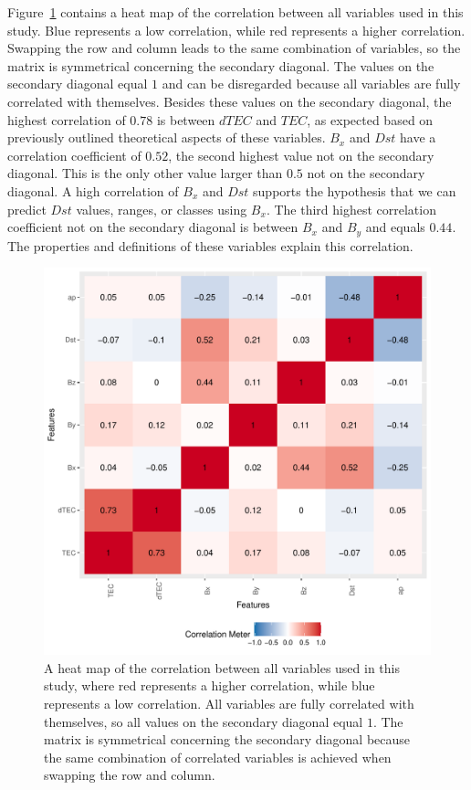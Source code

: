 \documentclass[sn-mathphys-num]{sn-jnl}%
\begin{document}
Figure~\ref{fig:correlation} contains a heat map of the correlation between all variables used in this study. Blue represents a low correlation, while red represents a higher correlation. Swapping the row and column leads to the same combination of variables, so the matrix is symmetrical concerning the secondary diagonal. The values on the secondary diagonal equal $1$ and can be disregarded because all variables are fully correlated with themselves. Besides these values on the secondary diagonal, the highest correlation of $0.78$ is between $dTEC$ and $TEC$, as expected based on previously outlined theoretical aspects of these variables. $B_{x}$ and $Dst$ have a correlation coefficient of $0.52$, the second highest value not on the secondary diagonal. This is the only other value larger than $0.5$ not on the secondary diagonal. A high correlation of $B_{x}$ and $Dst$ supports the hypothesis that we can predict $Dst$ values, ranges, or classes using $B_{x}$. The third highest correlation coefficient not on the secondary diagonal is between $B_{x}$ and $B_{y}$ and equals $0.44$. The properties and definitions of these variables explain this correlation.

\begin{figure}
 \centering
 \includegraphics[width=0.9\linewidth]{correlation.pdf}
    \caption{A heat map of the correlation between all variables used in this study, where red represents a higher correlation, while blue represents a low correlation. All variables are fully correlated with themselves, so all values on the secondary diagonal equal $1$. The matrix is symmetrical concerning the secondary diagonal because the same combination of correlated variables is achieved when swapping the row and column.}
    \label{fig:correlation}
\end{figure}
\end{document}

